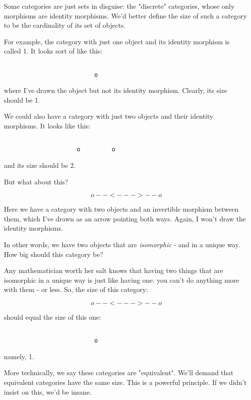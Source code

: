 Some categories are just sets in disguise: the "discrete"
categories, whose only morphisms are identity morphisms.  We'd better
define the size of such a category to be the cardinality of its set of
objects.

For example, the category with just one object and its identity 
morphism is called 1.  It looks sort of like this:


\begin{verbatim}

                          o 
\end{verbatim}
    
where I've drawn the object but not its identity morphism.  Clearly,
its size should be 1. 

We could also have a category with just two objects and their identity
morphisms.  It looks like this:


\begin{verbatim}

                     o         o
\end{verbatim}
    
and its size should be 2.

But what about this? 


$$

                     o--<--->--o
$$
    

Here we have a category with two objects and an invertible morphism 
between them, which I've drawn as an arrow pointing both ways.   Again,
I won't draw the identity morphisms.  

In other words, we have two objects that are \emph{isomorphic} - and
in a unique way.  How big should this category be?

Any mathematician worth her salt knows that having two things that are
isomorphic in a unique way is just like having one: you can't do 
anything more with them - or less.  So, the size of this category:


$$

                     o--<--->--o
$$
    
should equal the size of this one:


\begin{verbatim}

                          o 
\end{verbatim}
    
namely, 1.   

More technically, we say these categories are "equivalent".
We'll demand that equivalent categories have the same size.
This is a powerful principle.  If we didn't insist on this, 
we'd be insane.

